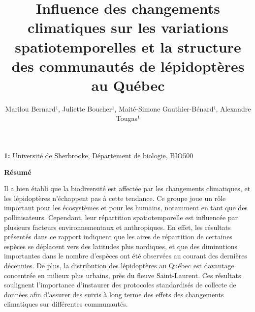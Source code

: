 \documentclass[9pt,twocolumn,twoside,]{pnas-new}
\title{Influence des changements climatiques sur les variations
spatiotemporelles et la structure des communautés de lépidoptères au
Québec}
\author[]{Marilou Bernard¹, Juliette Boucher¹, Maité-Simone
Gauthier-Bénard¹, Alexandre Tougas¹}
\begin{document}
\verticaladjustment{-2pt}



\maketitle
\thispagestyle{firststyle}


\acknow{}

\maketitle

\vspace{-45pt} \noindent \textbf{1:} Université de Sherbrooke,
Département de biologie, BIO500

\vspace{15pt}

\textbf{Résumé}

Il a bien établi que la biodiversité est affectée par les changements
climatiques, et les lépidoptères n'échappent pas à cette tendance. Ce
groupe joue un rôle important pour les écosystèmes et pour les humains,
notamment en tant que des pollinisateurs. Cependant, leur répartition
spatiotemporelle est influencée par plusieurs facteurs environnementaux
et anthropiques. En effet, les résultats présentés dans ce rapport
indiquent que les aires de répartition de certaines espèces se déplacent
vers des latitudes plus nordiques, et que des diminutions importantes
dans le nombre d'espèces ont été observées au courant des dernières
décennies. De plus, la distribution des lépidoptères au Québec est
davantage concentrée en milieux plus urbains, près du fleuve
Saint-Laurent. Ces résultats soulignent l'importance d'instaurer des
protocoles standardisés de collecte de données afin d'assurer des suivis
à long terme des effets des changements climatiques sur différentes
communautés. \vspace{10pt}
\end{document}
